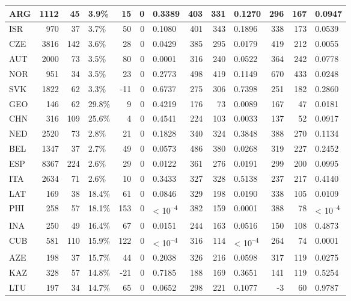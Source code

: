 \begin{tabular}{l|r|r|l|r|r|l|r|r|l|r|r|l}
\hline
ARG & 1112 & 45 & 3.9\% & 15 & 0 & 0.3389 & 403 & 331 & 0.1270 & 296 & 167 & 0.0947\\
\hline
ISR & 970 & 37 & 3.7\% & 50 & 0 & 0.1080 & 401 & 343 & 0.1896 & 338 & 173 & 0.0539\\
\hline
CZE & 3816 & 142 & 3.6\% & 28 & 0 & 0.0429 & 385 & 295 & 0.0179 & 419 & 212 & 0.0055\\
\hline
AUT & 2000 & 73 & 3.5\% & 80 & 0 & 0.0001 & 316 & 240 & 0.0522 & 364 & 242 & 0.0778\\
\hline
NOR & 951 & 34 & 3.5\% & 23 & 0 & 0.2773 & 498 & 419 & 0.1149 & 670 & 433 & 0.0248\\
\hline
SVK & 1822 & 62 & 3.3\% & -11 & 0 & 0.6737 & 275 & 306 & 0.7398 & 251 & 182 & 0.2860\\
\hline
GEO & 146 & 62 & 29.8\% & 9 & 0 & 0.4219 & 176 & 73 & 0.0089 & 167 & 47 & 0.0181\\
\hline
CHN & 316 & 109 & 25.6\% & 4 & 0 & 0.4541 & 224 & 103 & 0.0033 & 137 & 52 & 0.0917\\
\hline
NED & 2520 & 73 & 2.8\% & 21 & 0 & 0.1828 & 340 & 324 & 0.3848 & 388 & 270 & 0.1134\\
\hline
BEL & 1347 & 37 & 2.7\% & 49 & 0 & 0.0573 & 486 & 380 & 0.0268 & 319 & 227 & 0.2452\\
\hline
ESP & 8367 & 224 & 2.6\% & 29 & 0 & 0.0122 & 361 & 276 & 0.0191 & 299 & 200 & 0.0995\\
\hline
ITA & 2634 & 71 & 2.6\% & 10 & 0 & 0.3433 & 327 & 328 & 0.5138 & 237 & 217 & 0.4140\\
\hline
LAT & 169 & 38 & 18.4\% & 61 & 0 & 0.0846 & 329 & 198 & 0.0190 & 338 & 105 & 0.0109\\
\hline
PHI & 258 & 57 & 18.1\% & 153 & 0 & < 10\textsuperscript{--4} & 382 & 159 & 0.0001 & 388 & 78 & < 10\textsuperscript{--4}\\
\hline
INA & 250 & 49 & 16.4\% & 67 & 0 & 0.0151 & 244 & 163 & 0.0516 & 150 & 108 & 0.4873\\
\hline
CUB & 581 & 110 & 15.9\% & 122 & 0 & < 10\textsuperscript{--4} & 316 & 114 & < 10\textsuperscript{--4} & 264 & 74 & 0.0001\\
\hline
AZE & 198 & 37 & 15.7\% & 44 & 0 & 0.2038 & 326 & 216 & 0.0598 & 317 & 119 & 0.0275\\
\hline
KAZ & 328 & 57 & 14.8\% & -21 & 0 & 0.7185 & 188 & 169 & 0.3651 & 141 & 119 & 0.5254\\
\hline
LTU & 197 & 34 & 14.7\% & 65 & 0 & 0.0652 & 298 & 221 & 0.1077 & -3 & 60 & 0.9787\\

\end{tabular}
